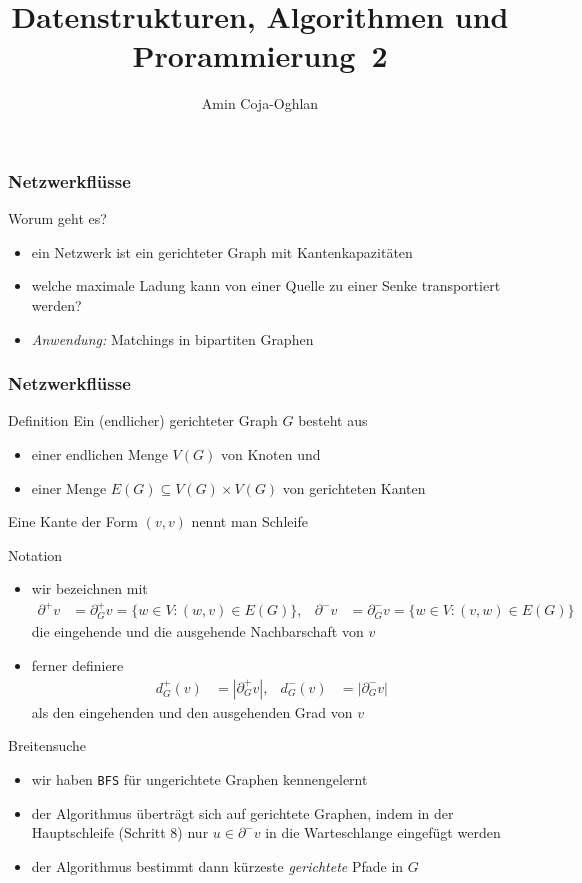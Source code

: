 \documentclass[aspectratio=1610, 11pt]{beamer}
\title{Datenstrukturen, Algorithmen und Prorammierung~2}
\author[A.~Coja-Oghlan]{Amin Coja-Oghlan}
\institute[DAP2]{Lehrstuhl Informatik 2\\Fakult\"at f\"ur Informatik}
\newcommand{\mytitle}{Netzwerkfl\"usse}
\begin{document}
\frame[plain]{\titlepage}

\begin{frame}\frametitle{\mytitle}
	\begin{exampleblock}{Worum geht es?}
		\begin{itemize}
			\item ein Netzwerk ist ein gerichteter Graph mit Kantenkapazit\"aten
			\item welche maximale Ladung kann von einer Quelle zu einer Senke transportiert werden?
			\item \emph{Anwendung:} Matchings in bipartiten Graphen
		\end{itemize}
	\end{exampleblock}
\end{frame}

\begin{frame}\frametitle{\mytitle}
	\begin{overprint}
		\begin{block}{Definition}
			Ein (endlicher) \alert{gerichteter Graph} $G$ besteht aus
			\begin{itemize}
				\item einer endlichen Menge $V(G)$ von \alert{Knoten} und
				\item einer Menge $E(G)\subseteq V(G)\times V(G)$ von \alert{gerichteten Kanten}
			\end{itemize}
			Eine Kante der Form $(v,v)$ nennt man \alert{Schleife}
		\end{block}
		\begin{exampleblock}{Notation}
			\begin{itemize}
				\item wir bezeichnen mit
					\begin{align*}
						\partial^+v&=\partial_G^+v=\{w\in V:(w,v)\in E(G)\},&\partial^-v&=\partial_G^-v=\{w\in V:(v,w)\in E(G)\}
					\end{align*}
					die eingehende und die ausgehende Nachbarschaft von $v$
				\item ferner definiere
					\begin{align*}
						d^+_G(v)&=|\partial^+_Gv|,&d^-_G(v)&=|\partial^-_Gv|
					\end{align*}
					als den eingehenden und den ausgehenden Grad von $v$
			\end{itemize}
		\end{exampleblock}
		\begin{exampleblock}{Breitensuche}
			\begin{itemize}
				\item wir haben {\tt BFS} f\"ur ungerichtete Graphen kennengelernt
				\item der Algorithmus \"ubertr\"agt sich auf gerichtete Graphen, indem in der Hauptschleife (Schritt 8) nur $u\in\partial^-v$ in die Warteschlange eingef\"ugt werden
				\item der Algorithmus bestimmt dann k\"urzeste \emph{gerichtete} Pfade in $G$
			\end{itemize}
		\end{exampleblock}
	\end{overprint}
\end{frame}
\end{document}

